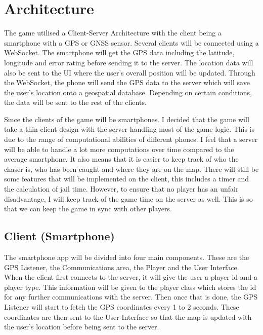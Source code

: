 \documentclass{l4proj}
\begin{document}
\section{Architecture}
\label{phase1architecture}
The game utilised a Client-Server Architecture with the client being a smartphone with a GPS or
GNSS sensor. Several clients will be connected using a WebSocket. The smartphone will get the GPS data including the
latitude, longitude and error rating before sending it to the server. The location data will also be sent 
to the UI where the user's overall position will be updated. Through the WebSocket, the phone will send the GPS data
to the server which will save the user's location onto a geospatial database. Depending on certain conditions, the data
will be sent to the rest of the clients.

Since the clients of the game will be smartphones. I decided that the game will take a thin-client design with the
server handling most of the game logic. This is due to the range of computational abilities of different phones. 
I feel that a server will be able to handle a lot more computations over time compared to the average smartphone.
It also means that it is easier to keep track of who the chaser is, who has been caught and where they are on the map.
There will still be some features that will be implemented on the client, this includes a timer and the calculation of
jail time. However, to ensure that no player has an unfair disadvantage, I will keep track of the game time on the
server as well. This is so that we can keep the game in sync with other players.

\subsection{Client (Smartphone)}
\label{designClient}
The smartphone app will be divided into four main components. These are the GPS Listener, the Communications area, the
Player and the User Interface. When the client first connects to the server, it will give the user a player id and a player
type. This information will be given to the player class which stores the id for any further communications with the server.
Then once that is done, the GPS Listener will start to fetch the GPS coordinates every 1 to 2 seconds. These coordinates are then sent
to the User Interface so that the map is updated with the user's location before being sent to the server.
\end{document}
